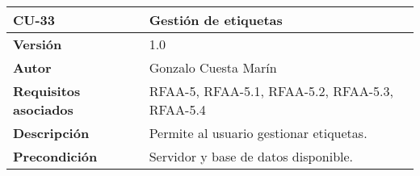 \begin{longtable}[]{@{}ll@{}}
\toprule
\begin{minipage}[b]{0.20\columnwidth}\raggedright
\textbf{CU-33}\strut
\end{minipage} & \begin{minipage}[b]{0.74\columnwidth}\raggedright
\textbf{Gestión de etiquetas}\strut
\end{minipage}\tabularnewline
\midrule
\endhead
\begin{minipage}[t]{0.20\columnwidth}\raggedright
\textbf{Versión}\strut
\end{minipage} & \begin{minipage}[t]{0.74\columnwidth}\raggedright
1.0\strut
\end{minipage}\tabularnewline
\begin{minipage}[t]{0.20\columnwidth}\raggedright
\textbf{Autor}\strut
\end{minipage} & \begin{minipage}[t]{0.74\columnwidth}\raggedright
Gonzalo Cuesta Marín\strut
\end{minipage}\tabularnewline
\begin{minipage}[t]{0.20\columnwidth}\raggedright
\textbf{Requisitos asociados}\strut
\end{minipage} & \begin{minipage}[t]{0.74\columnwidth}\raggedright
RFAA-5, RFAA-5.1, RFAA-5.2, RFAA-5.3, RFAA-5.4\strut
\end{minipage}\tabularnewline
\begin{minipage}[t]{0.20\columnwidth}\raggedright
\textbf{Descripción}\strut
\end{minipage} & \begin{minipage}[t]{0.74\columnwidth}\raggedright
Permite al usuario gestionar etiquetas.\strut
\end{minipage}\tabularnewline
\begin{minipage}[t]{0.20\columnwidth}\raggedright
\textbf{Precondición}\strut
\end{minipage} & \begin{minipage}[t]{0.74\columnwidth}\raggedright
Servidor y base de datos disponible.


\end{minipage}
\end{longtable}
